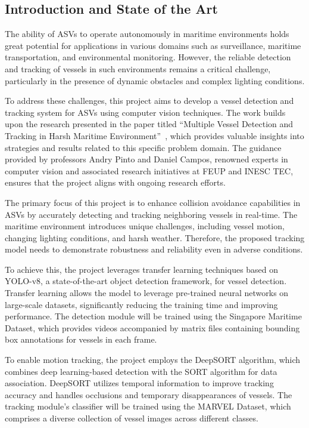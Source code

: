 \documentclass[a4paper,12pt]{article}
\begin{document}
\begin{multicols}{2}

\section{Introduction and State of the Art}\label{sec:introduction-and-state-of-the-art}
The ability of ASVs to operate autonomously in maritime environments holds great potential for applications in various domains such as surveillance, maritime transportation, and environmental monitoring.
However, the reliable detection and tracking of vessels in such environments remains a critical challenge, particularly in the presence of dynamic obstacles and complex lighting conditions.

To address these challenges, this project aims to develop a vessel detection and tracking system for ASVs using computer vision techniques.
The work builds upon the research presented in the paper titled ``Multiple Vessel Detection and Tracking in Harsh Maritime Environment''~\cite{MVDTHME}, which provides valuable insights into strategies and results related to this specific problem domain.
The guidance provided by professors Andry Pinto and Daniel Campos, renowned experts in computer vision and associated research initiatives at FEUP and INESC TEC, ensures that the project aligns with ongoing research efforts.

The primary focus of this project is to enhance collision avoidance capabilities in ASVs by accurately detecting and tracking neighboring vessels in real-time.
The maritime environment introduces unique challenges, including vessel motion, changing lighting conditions, and harsh weather.
Therefore, the proposed tracking model needs to demonstrate robustness and reliability even in adverse conditions.

To achieve this, the project leverages transfer learning techniques based on YOLO-v8, a state-of-the-art object detection framework, for vessel detection.
Transfer learning allows the model to leverage pre-trained neural networks on large-scale datasets, significantly reducing the training time and improving performance.
The detection module will be trained using the Singapore Maritime Dataset, which provides videos accompanied by matrix files containing bounding box annotations for vessels in each frame.

To enable motion tracking, the project employs the DeepSORT algorithm, which combines deep learning-based detection with the SORT algorithm for data association.
DeepSORT utilizes temporal information to improve tracking accuracy and handles occlusions and temporary disappearances of vessels.
The tracking module's classifier will be trained using the MARVEL Dataset, which comprises a diverse collection of vessel images across different classes.


\end{multicols}
\end{document}
